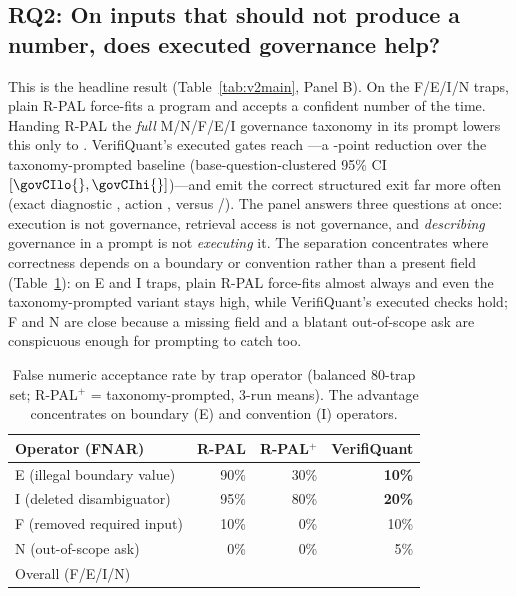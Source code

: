 \subsection*{RQ2: On inputs that should not produce a number, does executed governance help?}
This is the headline result (Table~\ref{tab:v2main}, Panel B).
On the F/E/I/N traps, plain R-PAL force-fits a program and accepts a confident number \govPlainFnar{} of the time.
Handing R-PAL the \emph{full} M/N/F/E/I governance taxonomy in its prompt lowers this only to \govPromptFnar{}.
VerifiQuant's executed gates reach \govVQfnar{}---a \govGap{}-point reduction over the taxonomy-prompted baseline (base-question-clustered 95\% CI $[\govCIlo{},\govCIhi{}]$)---and emit the correct structured exit far more often (exact diagnostic \govVQdiag{}, action \govVQaction{}, versus \govPromptDiag{}/\govPromptAction{}).
The panel answers three questions at once: execution is not governance, retrieval access is not governance, and \emph{describing} governance in a prompt is not \emph{executing} it.
The separation concentrates where correctness depends on a boundary or convention rather than a present field (Table~\ref{tab:v2trapop}): on E and I traps, plain R-PAL force-fits almost always and even the taxonomy-prompted variant stays high, while VerifiQuant's executed checks hold; F and N are close because a missing field and a blatant out-of-scope ask are conspicuous enough for prompting to catch too.

\begin{table}[t]
\caption{False numeric acceptance rate by trap operator (balanced 80-trap set; R-PAL$^{+}$ = taxonomy-prompted, 3-run means).
The advantage concentrates on boundary (E) and convention (I) operators.}
\label{tab:v2trapop}
\small
\begin{tabular}{@{}lrrr@{}}
\toprule
Operator (FNAR) & R-PAL & R-PAL$^{+}$ & VerifiQuant \\
\midrule
E (illegal boundary value) & 90\% & 30\% & \textbf{10\%} \\
I (deleted disambiguator) & 95\% & 80\% & \textbf{20\%} \\
F (removed required input) & 10\% & 0\% & 10\% \\
N (out-of-scope ask) & 0\% & 0\% & 5\% \\
\midrule
Overall (F/E/I/N) & \govPlainFnar{} & \govPromptFnar{} & \textbf{\govVQfnar{}} \\
\bottomrule
\end{tabular}
\end{table}

